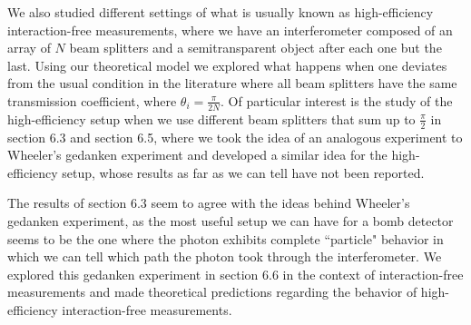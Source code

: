 \documentclass[12pt]{book}
\begin{document}
We also studied different settings of what is usually known as high-efficiency interaction-free measurements, where we have an interferometer composed of an array of $N$ beam splitters and a semitransparent object after each one but the last. Using our theoretical model we explored what happens when one deviates from the usual condition in the literature where all beam splitters have the same transmission coefficient, where  $\theta_{i}=\frac{\pi}{2N}$. Of particular interest is the study of the high-efficiency setup when we use different beam splitters that sum up to $\frac{\pi}{2}$ in section 6.3 and section 6.5, where we took the idea of an analogous experiment to Wheeler's gedanken experiment \cite{azuri} and developed a similar idea for the high-efficiency setup, whose results as far as we can tell have not been reported.

The results of section 6.3 seem to agree with the ideas behind Wheeler's gedanken experiment, as the most useful setup we can have for a bomb detector seems to be the one where the photon exhibits complete ``particle" behavior in which we can tell which path the photon took through the interferometer. We explored this gedanken experiment in section 6.6 in the context of interaction-free measurements and made theoretical predictions regarding the behavior of high-efficiency interaction-free measurements.
\end{document}
